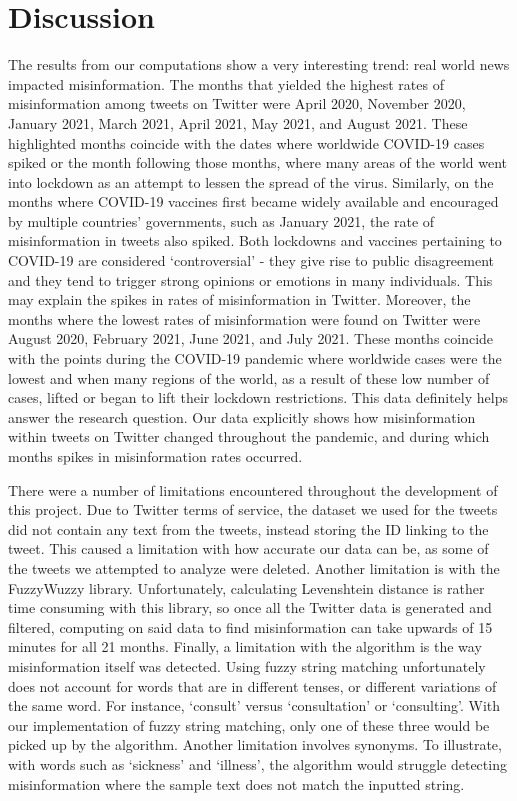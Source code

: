 \documentclass[fontsize=11pt]{article}
\begin{document}
    \section*{Discussion}
    \begin{flushleft}

        The results from our computations show a very interesting trend: real world news impacted misinformation. The months that yielded the highest rates of misinformation among tweets on Twitter were April 2020, November 2020, January 2021, March 2021, April 2021, May 2021, and August 2021. These highlighted months coincide with the dates where worldwide COVID-19 cases spiked or the month following those months, where many areas of the world went into lockdown as an attempt to lessen the spread of the virus. Similarly, on the months where COVID-19 vaccines first became widely available and encouraged by multiple countries' governments, such as January 2021, the rate of misinformation in tweets also spiked. Both lockdowns and vaccines pertaining to COVID-19 are considered `controversial' - they give rise to public disagreement and they tend to trigger strong opinions or emotions in many individuals. This may explain the spikes in rates of misinformation in Twitter. Moreover, the months where the lowest rates of misinformation were found on Twitter were August 2020, February 2021, June 2021, and July 2021. These months coincide with the points during the COVID-19 pandemic where worldwide cases were the lowest and when many regions of the world, as a result of these low number of cases, lifted or began to lift their lockdown restrictions. This data definitely helps answer the research question. Our data explicitly shows how misinformation within tweets on Twitter changed throughout the pandemic, and during which months spikes in misinformation rates occurred.\hfill\break

        There were a number of limitations encountered throughout the development of this project. Due to Twitter terms of service, the dataset we used for the tweets did not contain any text from the tweets, instead storing the ID linking to the tweet. This caused a limitation with how accurate our data can be, as some of the tweets we attempted to analyze were deleted. Another limitation is with the FuzzyWuzzy library. Unfortunately, calculating Levenshtein distance is rather time consuming with this library, so once all the Twitter data is generated and filtered, computing on said data to find misinformation can take upwards of 15 minutes for all 21 months. Finally, a limitation with the algorithm is the way misinformation itself was detected. Using fuzzy string matching unfortunately does not account for words that are in different tenses, or different variations of the same word. For instance, `consult' versus `consultation' or `consulting'. With our implementation of fuzzy string matching, only one of these three would be picked up by the algorithm. Another limitation involves synonyms. To illustrate, with words such as `sickness' and `illness', the algorithm would struggle detecting misinformation where the sample text does not match the inputted string. \hfill\break


\end{flushleft}
\end{document}

